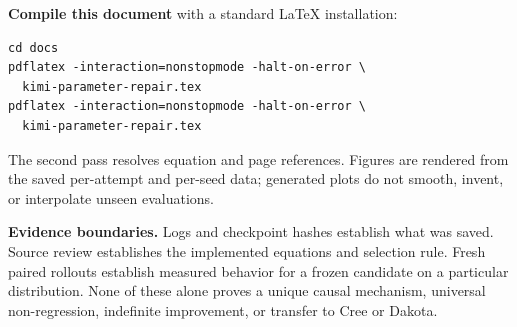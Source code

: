 \documentclass[11pt]{article}
\begin{document}
\textbf{Compile this document} with a standard LaTeX installation:
\begin{verbatim}
cd docs
pdflatex -interaction=nonstopmode -halt-on-error \
  kimi-parameter-repair.tex
pdflatex -interaction=nonstopmode -halt-on-error \
  kimi-parameter-repair.tex
\end{verbatim}
The second pass resolves equation and page references. Figures are rendered
from the saved per-attempt and per-seed data; generated plots do not smooth,
invent, or interpolate unseen evaluations.

\textbf{Evidence boundaries.} Logs and checkpoint hashes establish what was
saved. Source review establishes the implemented equations and selection rule.
Fresh paired rollouts establish measured behavior for a frozen candidate on a
particular distribution. None of these alone proves a unique causal mechanism,
universal non-regression, indefinite improvement, or transfer to Cree or Dakota.
\end{document}
